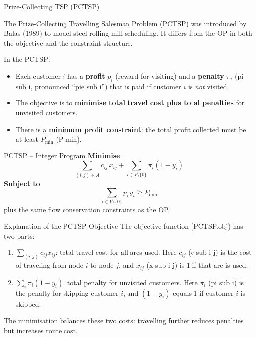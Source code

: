 \documentclass[aspectratio=169,10pt]{beamer}
\begin{document}
\begin{frame}[allowframebreaks]{Prize-Collecting TSP (PCTSP)}

  The Prize-Collecting Travelling Salesman Problem (PCTSP) was introduced
  by Balas (1989) to model steel rolling mill scheduling.
  It differs from the OP in both the objective and the constraint structure.

  \medskip
  In the PCTSP:
  \begin{itemize}
    \item Each customer $i$ has a \textbf{profit} $p_i$ (reward for visiting)
          and a \textbf{penalty} $\pi_i$ (pi sub i, pronounced ``pie sub i'')
          that is paid if customer $i$ is \emph{not} visited.
    \item The objective is to \textbf{minimise total travel cost plus total
          penalties} for unvisited customers.
    \item There is a \textbf{minimum profit constraint}: the total profit
          collected must be at least $P_{\min}$ (P-min).
  \end{itemize}

  \medskip
  \begin{block}{PCTSP -- Integer Program}
    \textbf{Minimise}
    \[
      \sum_{(i,j) \in A} c_{ij} \, x_{ij}
      + \sum_{i \in V \setminus \{0\}} \pi_i (1 - y_i)
      \tag{PCTSP.obj}
    \]
    \textbf{Subject to}
    \[
      \sum_{i \in V \setminus \{0\}} p_i \, y_i \ge P_{\min}
      \tag{PCTSP.profit}
    \]
    plus the same flow conservation constraints as the OP.
  \end{block}

  \framebreak

  \begin{block}{Explanation of the PCTSP Objective}
    The objective function (PCTSP.obj) has two parts:
    \begin{enumerate}
      \item $\sum_{(i,j)} c_{ij} x_{ij}$: total travel cost for all arcs
            used.
            Here $c_{ij}$ (c sub i j) is the cost of traveling from node
            $i$ to node $j$, and $x_{ij}$ (x sub i j) is 1 if that arc is
            used.
      \item $\sum_{i} \pi_i (1 - y_i)$: total penalty for unvisited
            customers.
            Here $\pi_i$ (pi sub i) is the penalty for skipping customer
            $i$, and $(1 - y_i)$ equals 1 if customer $i$ is skipped.
    \end{enumerate}
    The minimisation balances these two costs: travelling further reduces
    penalties but increases route cost.
  \end{block}


\end{frame}
\end{document}
